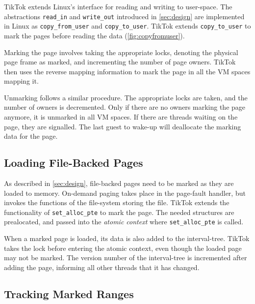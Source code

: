 \documentclass[conference]{IEEEtran}
\newcommand{\sysname}{TikTok}
\begin{document}
\sysname{} extends Linux's interface for reading and writing to user-space. The
abstractions \texttt{read\_in} and \texttt{write\_out} introduced in
\autoref{sec:design} are implemented in Linux as \texttt{copy\_from\_user} and
\texttt{copy\_to\_user}. \sysname{} extends \texttt{copy\_to\_user} to mark the pages
before reading the data (\autoref{fig:copyfromuser}).

Marking the page involves taking the appropriate locks, denoting the physical
page frame as marked, and incrementing the number of page owners. \sysname{} then
uses the reverse mapping information to mark the page in all the VM spaces
mapping it.

Unmarking follows a similar procedure. The appropriate locks are taken, and the
number of owners is decremented. Only if there are no owners marking the page
anymore, it is unmarked in all VM spaces. If there are threads waiting on the
page, they are signalled. The last guest to wake-up will deallocate the marking
data for the page.

\subsection{Loading File-Backed Pages}

As described in \autoref{sec:design}, file-backed pages need to be marked as
they are loaded to memory. On-demand paging takes place in the page-fault
handler, but invokes the functions of the file-system storing the file. \sysname{}
extends the functionality of \texttt{set\_alloc\_pte} to mark the page. The
needed structures are prealocated, and passed into the \emph{atomic context} where 
\texttt{set\_alloc\_pte} is called.

When a marked page is loaded, its data is also added to the interval-tree.
\sysname{} takes the lock before entering the atomic context, even though the
loaded page may not be marked. The version number of the interval-tree is
incremented after adding the page, informing all other threads that it has
changed.

\subsection{Tracking Marked Ranges}
\end{document}
